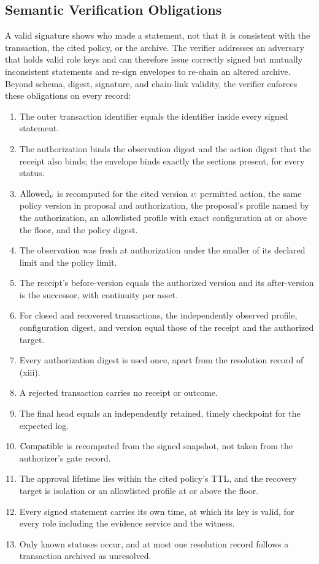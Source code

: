 \subsection{Semantic Verification Obligations}
\label{sec:semantic}
A valid signature shows who made a statement, not that it is consistent with the transaction, the cited policy, or the archive. The verifier addresses an adversary that holds valid role keys and can therefore issue correctly signed but mutually inconsistent statements and re-sign envelopes to re-chain an altered archive. Beyond schema, digest, signature, and chain-link validity, the verifier enforces these obligations on every record:
\begin{enumerate}
\item The outer transaction identifier equals the identifier inside every signed statement.
\item The authorization binds the observation digest and the action digest that the receipt also binds; the envelope binds exactly the sections present, for every status.
\item $\mathrm{Allowed}_v$ is recomputed for the cited version $v$: permitted action, the same policy version in proposal and authorization, the proposal's profile named by the authorization, an allowlisted profile with exact configuration at or above the floor, and the policy digest.
\item The observation was fresh at authorization under the smaller of its declared limit and the policy limit.
\item The receipt's before-version equals the authorized version and its after-version is the successor, with continuity per asset.
\item For closed and recovered transactions, the independently observed profile, configuration digest, and version equal those of the receipt and the authorized target.
\item Every authorization digest is used once, apart from the resolution record of (xiii).
\item A rejected transaction carries no receipt or outcome.
\item The final head equals an independently retained, timely checkpoint for the expected log.
\item $\mathrm{Compatible}$ is recomputed from the signed snapshot, not taken from the authorizer's gate record.
\item The approval lifetime lies within the cited policy's TTL, and the recovery target is isolation or an allowlisted profile at or above the floor.
\item Every signed statement carries its own time, at which its key is valid, for every role including the evidence service and the witness.
\item Only known statuses occur, and at most one resolution record follows a transaction archived as unresolved.
\end{enumerate}

